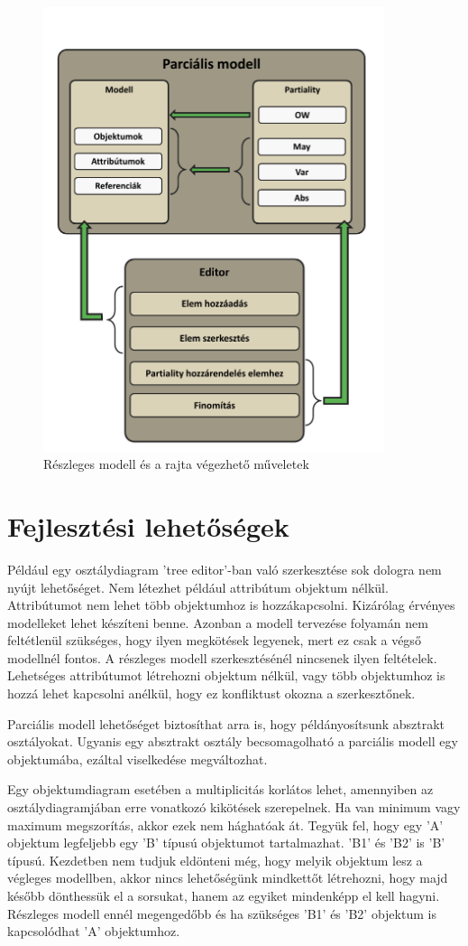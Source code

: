 \begin{figure}[!ht]
	\centering
	\includegraphics[width=100mm]{figures/overview.pdf}
	\caption{Részleges modell és a rajta végezhető műveletek} 
	\label{overview}
\end{figure}


\section{Fejlesztési lehetőségek}
Például egy osztálydiagram 'tree editor'-ban való szerkesztése sok dologra nem nyújt lehetőséget. 
Nem létezhet például attribútum objektum nélkül. Attribútumot nem lehet több objektumhoz is hozzákapcsolni. Kizárólag érvényes modelleket lehet készíteni benne. Azonban a modell tervezése folyamán nem feltétlenül szükséges, hogy ilyen megkötések legyenek, mert ez csak a végső modellnél fontos. A részleges modell szerkesztésénél nincsenek ilyen feltételek. Lehetséges attribútumot létrehozni objektum nélkül, vagy több objektumhoz is hozzá lehet kapcsolni anélkül, hogy ez konfliktust okozna a szerkesztőnek.
\par
Parciális modell lehetőséget biztosíthat arra is, hogy példányosítsunk absztrakt osztályokat. Ugyanis egy absztrakt osztály becsomagolható a parciális modell egy objektumába, ezáltal viselkedése megváltozhat. 
\par
Egy objektumdiagram esetében a multiplicitás korlátos lehet, amennyiben az osztálydiagramjában erre vonatkozó kikötések szerepelnek. Ha van minimum vagy maximum megszorítás, akkor ezek nem hághatóak át. Tegyük fel, hogy egy 'A' objektum legfeljebb egy 'B' típusú objektumot tartalmazhat. 'B1' és 'B2' is 'B' típusú. Kezdetben nem tudjuk eldönteni még, hogy melyik objektum lesz a végleges modellben, akkor nincs lehetőségünk mindkettőt létrehozni, hogy majd később dönthessük el a sorsukat, hanem az egyiket mindenképp el kell hagyni. Részleges modell ennél megengedőbb és ha szükséges 'B1' és 'B2' objektum is kapcsolódhat 'A' objektumhoz.

